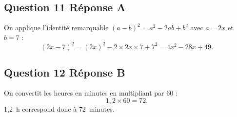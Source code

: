 \documentclass[10pt]{article}
\begin{document}
\subsection*{Question 11 \quad Réponse A}

On applique l'identité remarquable $(a-b)^2 = a^2 - 2ab + b^2$ avec $a = 2x$ et $b = 7$ :
\[(2x-7)^2 = (2x)^2 - 2 \times 2x \times 7 + 7^2 = 4x^2 - 28x + 49.\]

\subsection*{Question 12 \quad Réponse B}

On convertit les heures en minutes en multipliant par 60 :
\[1,2 \times 60 = 72.\]
1,2~h correspond donc à 72~minutes.
\end{document}
